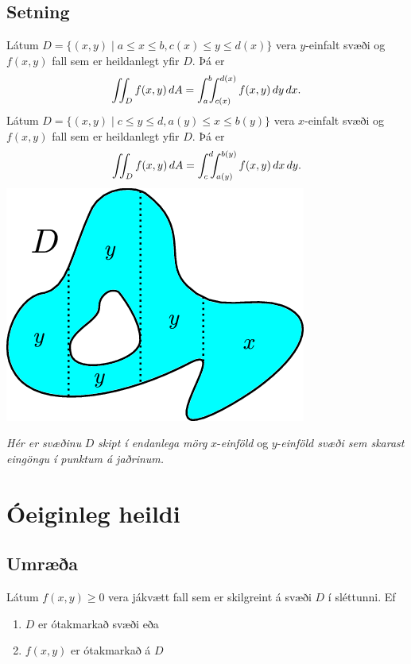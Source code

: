 \documentclass[a4paper,10pt,icelandic]{sphinxmanual}
\begin{document}
\subsection{Setning}
\label{Kafli4:id7}
Látum \(D=\{(x,y)\mid a\leq x\leq b, c(x)\leq y\leq d(x)\}\) vera
\(y\)-einfalt svæði og \(f(x,y)\) fall sem er heildanlegt yfir
\(D\). Þá er
\begin{gather}
\begin{split}\displaystyle \int\!\!\!\int_D f(x,y)\,dA=\int_a^b\!\!\!\int_{c(x)}^{d(x)}f(x,y)\,dy\, dx.\end{split}\notag
\end{gather}
Látum \(D=\{(x,y)\mid c\leq y\leq d, a(y)\leq x\leq b(y)\}\) vera
\(x\)-einfalt svæði og \(f(x,y)\) fall sem er heildanlegt yfir
\(D\). Þá er
\begin{gather}
\begin{split}\displaystyle \int\!\!\!\int_D f(x,y)\,dA=\int_c^d\!\!\!\int_{a(y)}^{b(y)}f(x,y)\,dx\, dy.\end{split}\notag
\end{gather}
{\hfill\includegraphics[width=0.350\linewidth]{einfalt2.png}\hfill}

\emph{Hér er svæðinu} \(D\) \emph{skipt í endanlega mörg} \(x\)-\emph{einföld} og \(y\)-\emph{einföld svæði sem skarast eingöngu í punktum á jaðrinum.}


\section{Óeiginleg heildi}
\label{Kafli4:index-5}\label{Kafli4:oeiginleg-heildi}

\subsection{Umræða}
\label{Kafli4:umraea}
Látum \(f(x,y)\geq 0\) vera jákvætt fall sem er skilgreint á svæði
\(D\) í sléttunni. Ef
\begin{enumerate}
\item {} 
\(D\) er ótakmarkað svæði eða

\item {} 
\(f(x,y)\) er ótakmarkað á \(D\)

\end{enumerate}
\end{document}
